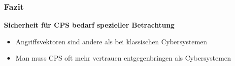 \documentclass{sikslides}
\begin{document}
    \begin{frame}
        \frametitle{Fazit}

        \begin{center}
               \bf Sicherheit für CPS bedarf spezieller Betrachtung
        \end{center}

        \begin{itemize}
            \item Angriffsvektoren sind andere als bei klassischen Cybersystemen
            \item Man muss CPS oft mehr vertrauen entgegenbringen als Cybersystemen
        \end{itemize}
    \end{frame}
\end{document}
